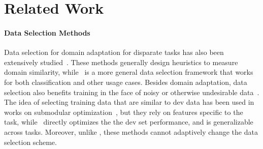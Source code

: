 \section{\label{sec:related_work}Related Work}
\paragraph{Data Selection Methods} Data selection for domain adaptation for disparate tasks has also been extensively studied~\citep{moore2010intelligent,axelrod2011domain,domain_adapt_transfer,jiang-zhai-2007-instance,foster-etal-2010-discriminative,wang-etal-2017-instance}. These methods generally design heuristics to measure domain similarity,
while \dds~is a more general data selection framework that works for both classification and other usage cases. Besides domain adaptation, data selection also benefits training in the face of noisy or otherwise undesirable data~\citep{vyas-etal-2018-identifying,pham-etal-2018-fixing}. 
The idea of selecting training data that are similar to dev data has been used in works on submodular optimization~\citep{submodular_mt,learn_mix_submodular}, but they rely on features specific to the task, while \dds~directly optimizes the the dev set performance, and is generalizable across tasks. Moreover, unlike \dds, these methods cannot adaptively change the data selection scheme. 


